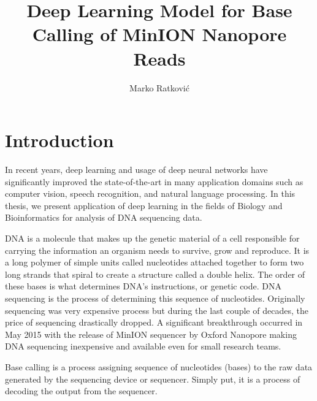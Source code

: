 \documentclass[times, utf8, diplomski, english]{fer}
\begin{document}

\title{Deep Learning Model for Base Calling of MinION Nanopore Reads}

\author{Marko Ratković}

\maketitle

\izvornik


\tableofcontents
\listoffigures
\listoftables

\chapter{Introduction}

In recent years,  deep learning and usage of deep neural networks have significantly improved the state-of-the-art in many application domains such as computer vision, speech recognition, and natural language processing. 
In this thesis, we present application of deep learning in the fields of Biology and Bioinformatics for analysis of DNA sequencing data. 

DNA is a molecule that makes up the genetic material of a cell responsible for carrying the information an organism needs to survive, grow and reproduce. 
It is a long polymer of simple units called nucleotides attached together to form two long strands that spiral to create a structure called a double helix. The order of these bases is what determines DNA's instructions, or genetic code.
DNA sequencing is the process of determining this sequence of nucleotides. Originally sequencing was very expensive process but 
during the last couple of decades, the price of sequencing drastically dropped. A significant breakthrough occurred in May 2015 with the release of MinION sequencer by Oxford Nanopore making DNA sequencing inexpensive and available even for small research teams.

Base calling is a process assigning sequence of nucleotides (bases) to the raw data generated by the sequencing device or sequencer. Simply put, it is a process of decoding the output from the sequencer.
\end{document}

